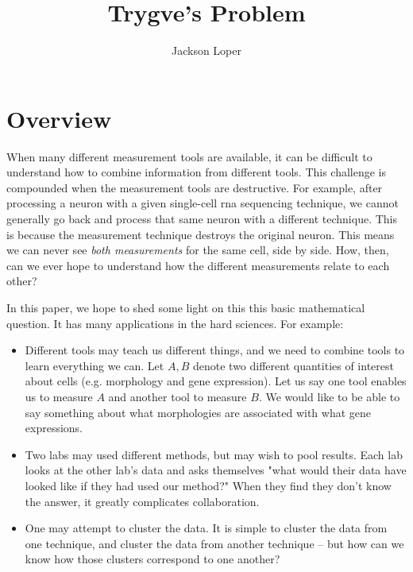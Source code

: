 




\title{Trygve's Problem}
\author{Jackson Loper}

\usepackage{amsthm}
\newtheorem{thm}{Theorem}


\maketitle

\section{Overview}

When many different measurement tools are available, it can be difficult to understand
how to combine information from different tools.  This challenge is compounded when the measurement
tools are destructive.  For example, after processing a neuron with a given single-cell rna
sequencing technique, we cannot generally go back and process that same neuron with a different
technique.  This is because the measurement technique destroys the original neuron.  This means
we can never see \emph{both measurements} for the same cell, side by side.  How, then, can we ever
hope to understand how the different measurements relate to each other?

In this paper, we hope to shed some light on this this basic mathematical question.  It has many
applications in the hard sciences.  For example:

\begin{itemize}

\item Different tools may teach us different things, and we need to combine tools
to learn everything we can.  Let $A,B$ denote two different quantities of interest about cells (e.g. morphology and gene expression).   Let us say one tool enables us to measure $A$ and another tool to measure $B$.  We would like
to be able to say something about what morphologies are associated with what gene expressions.  

\item Two labs may used different methods, but may wish to pool results.  Each lab looks at the other
lab's data and asks themselves "what would their data have looked like if they had used our method?"  When
they find they don't know the answer, it greatly complicates collaboration.

\item One may attempt to cluster the data.  It is simple to cluster the data from one technique, and cluster the data
from another technique -- but how can we know how those clusters correspond to one another?  

\end{itemize}

